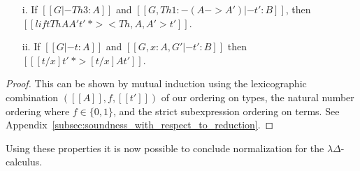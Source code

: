 \begin{lemma}
  \label{lemma:soundness_reduction}  
  \begin{itemize}
  \item[]
  \item[i.] If $[[G |- Th 3 : A]]$ and $[[G, Th 1:{-(A->A')} |- t' : B]]$, then
    $[[lift Th A A' t' ~*> <Th,A,A'>t']]$.
  
  \item[ii.] If $[[G |- t : A]]$ and $[[G, x:A, G' |- t':B]]$ then 
    $[[ [t/x]t' ~*> [t/x] A t']]$.   
  \end{itemize}  
\end{lemma}
\begin{proof}
  This can be shown by mutual induction using the lexicographic
  combination $([[A]], f,[[t']])$ of our ordering on types, the
  natural number ordering where $f \in \{0,1\}$, and the strict
  subexpression ordering on terms.
  See Appendix~\ref{subsec:soundness_with_respect_to_reduction}.
\end{proof}
Using these properties it is now possible to conclude normalization for the $\lambda\Delta$-calculus.

